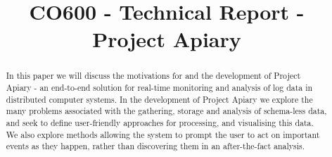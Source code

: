 \documentclass[10pt, a4paper, conference, compsocconf]{IEEEtran}
\begin{document}


%
\title{CO600 - Technical Report - Project Apiary}



\author{
  \and
  \and
  \and
}

\maketitle

\begin{abstract}
In this paper we will discuss the motivations for and the development of Project
Apiary - an end-to-end solution for real-time monitoring and analysis of log
data in distributed computer systems. In the development of Project Apiary we
explore the many problems associated with the gathering, storage and analysis of
schema-less data, and seek to define user-friendly approaches for processing,
and visualising this data. We also explore methods allowing the system to prompt
the user to act on important events as they happen, rather than discovering them
in an after-the-fact analysis.
\end{abstract}

%

\IEEEpeerreviewmaketitle





















\end{document}
